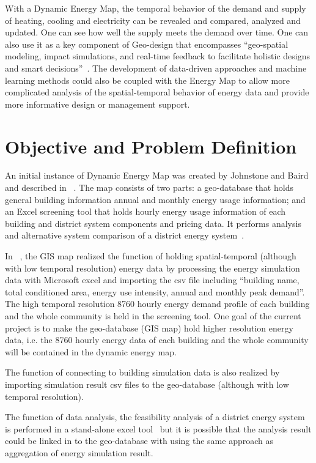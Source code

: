 With a Dynamic Energy Map, the temporal behavior of the demand and
supply of heating, cooling and electricity can be revealed and
compared, analyzed and updated. One can see how well the supply meets
the demand over time. One can also use it as a key component of
Geo-design that encompasses ``geo-spatial modeling, impact
simulations, and real-time feedback to facilitate holistic designs and
smart decisions''~\cite{esriGeodesign2012}. The development of
data-driven approaches and machine learning methods could also be
coupled with the Energy Map to allow more complicated analysis of the
spatial-temporal behavior of energy data and provide more informative
design or management support.

\section{Objective and Problem Definition}
An initial instance of Dynamic Energy Map was created by Johnstone and
Baird and described in ~\cite{baird2014}. The map consists of two
parts: a geo-database that holds general building information annual
and monthly energy usage information; and an Excel screening tool that
holds hourly energy usage information of each building and district
system components and pricing data. It performs analysis and
alternative system comparison of a district energy
system~\cite{baird2014}.

In ~\cite{baird2014}, the GIS map realized the function of holding
spatial-temporal (although with low temporal resolution) energy data
by processing the energy simulation data with Microsoft excel and
importing the csv file including ``building name, total conditioned
area, energy use intensity, annual and monthly peak demand''. The high
temporal resolution 8760 hourly energy demand profile of each building
and the whole community is held in the screening tool. One goal of the
current project is to make the geo-database (GIS map) hold higher
resolution energy data, i.e. the 8760 hourly energy data of each
building and the whole community will be contained in the dynamic
energy map.

The function of connecting to building simulation data is also
realized by importing simulation result csv files to the geo-database
(although with low temporal resolution).

The function of data analysis, the feasibility analysis of a district
energy system is performed in a stand-alone excel
tool~\cite{baird2014} but it is possible that the analysis result
could be linked in to the geo-database with using the same approach as
aggregation of energy simulation result.

